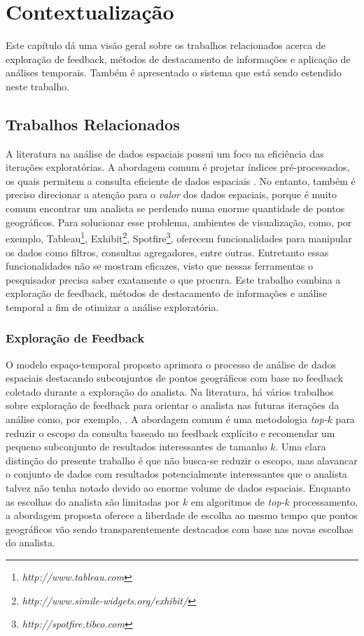 \chapter{Contextualização}
\label{chap:contextualizacao}

Este capítulo dá uma visão geral sobre os trabalhos relacionados acerca de exploração de feedback, métodos de destacamento de informações e aplicação de análises temporais. Também é apresentado o sistema que está sendo estendido neste trabalho.

\section{Trabalhos Relacionados}

A literatura na análise de dados espaciais possui um foco na eficiência das iterações exploratórias. A abordagem comum é projetar índices pré-processados, os quais permitem a consulta eficiente de dados espaciais \cite{lins2013nanocubes}. No entanto, também é preciso direcionar a atenção para o {\em valor} dos dados espaciais, porque é muito comum encontrar um analista se perdendo numa enorme quantidade de pontos geográficos. Para solucionar esse problema, ambientes de visualização, como, por exemplo, Tableau\footnote{\it http://www.tableau.com}, Exhibit\footnote{\it http://www.simile-widgets.org/exhibit/}, Spotfire\footnote{\it  http://spotfire.tibco.com}, oferecem funcionalidades para manipular os dados como filtros, consultas agregadores, entre outras. Entretanto essas funcionalidades não se mostram eficazes, visto que nessas ferramentas o pesquisador precisa saber exatamente o que procura. Este trabalho combina a exploração de feedback, métodos de destacamento de informações e análise temporal a fim de otimizar a análise exploratória.

\subsection{Exploração de Feedback}

O modelo espaço-temporal proposto aprimora o processo de análise de dados espaciais destacando subconjuntos de pontos geográficos com base no feedback coletado durante a exploração do analista. Na literatura, há vários trabalhos sobre exploração de feedback para orientar o analista nas futuras iterações da análise como, por exemplo, . A abordagem comum é uma metodologia {\em top-$k$} para reduzir o escopo da consulta baseado no feedback explícito e recomendar um pequeno subconjunto de resultados interessantes de tamanho $k$. Uma clara distinção do presente trabalho é que não busca-se reduzir o escopo, mas alavancar o conjunto de dados com resultados potencialmente interessantes que o analista talvez não tenha notado devido ao enorme volume de dados espaciais. Enquanto as escolhas do analista são limitadas por $k$ em algoritmos de {\em top-$k$} processamento, a abordagem proposta oferece a liberdade de escolha ao mesmo tempo que pontos geográficos vão sendo transparentemente destacados com base nas novas escolhas do analista.

